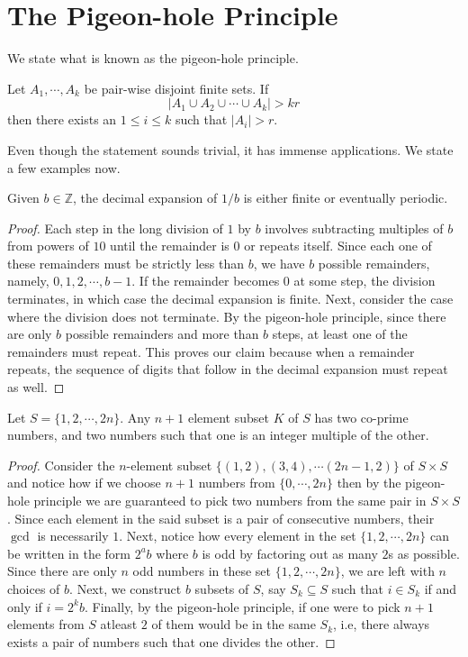 \section{The Pigeon-hole Principle}
We state what is known as the pigeon-hole principle.
\begin{theorem}
Let $A_{1},\cdots,A_{k}$ be pair-wise disjoint finite sets. If \[|A_{1}\cup A_{2}\cup \cdots \cup A_{k}|>kr\] then there exists an $1\leq i\leq k$ such that $|A_{i}|>r$.
\end{theorem}
Even though the statement sounds trivial, it has immense applications. We state a few examples now. 
\begin{claim}
Given $b\in \mathbb{Z}$, the decimal expansion of $1/b$ is either finite or eventually periodic.
\end{claim}
\begin{proof}
Each step in the long division of $1$ by $b$ involves subtracting multiples of $b$ from powers of $10$ until the remainder is $0$ or repeats itself. Since each one of these remainders must be strictly less than $b$, we have $b$ possible remainders, namely, $0, 1, 2, \cdots, b-1$. If the remainder becomes $0$ at some step, the division terminates, in which case the decimal expansion is finite. Next, consider the case where the division does not terminate. By the pigeon-hole principle, since there are only $b$ possible remainders and more than $b$ steps, at least one of the remainders must repeat. This proves our claim because when a remainder repeats, the sequence of digits that follow in the decimal expansion must repeat as well.
\end{proof}
\begin{claim}
Let $S=\{1,2,\cdots,2n\}$. Any $n+1$ element subset $K$ of $S$ has two co-prime numbers, and two numbers such that one is an integer multiple of the other. 
\end{claim}
\begin{proof}
Consider the $n$-element subset $\{\left( 1,2 \right), \left( 3,4 \right), \cdots \left( 2n-1,2 \right)\}$ of $S\times S$ and notice how if we choose $n+1$ numbers from $\{0,\cdots,2n\}$ then by the pigeon-hole principle we are guaranteed to pick two numbers from the same pair in $S\times S$. Since each element in the said subset is a pair of consecutive numbers, their $\gcd$ is necessarily $1$. Next, notice how every element in the set $\{1,2,\cdots,2n\}$ can be written in the form $2^ab$ where $b$ is odd by factoring out as many $2$s as possible. Since there are only $n$ odd numbers in these set $\{1,2,\cdots,2n\}$, we are left with $n$ choices of $b$. Next, we construct $b$ subsets of $S$, say $S_k\subseteq S$ such that $i\in S_k$ if and only if $i=2^kb$. Finally, by the pigeon-hole principle, if one were to pick $n+1$ elements from $S$ atleast $2$ of them would be in the same $S_k$, i.e, there always exists a pair of numbers such that one divides the other.
\end{proof}
